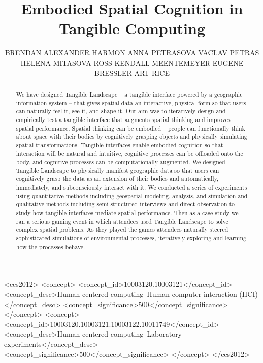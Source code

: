 \documentclass[prodmode,acmtochi]{acmsmall} %
\begin{document}

\title{Embodied Spatial Cognition in Tangible Computing} %
\author{BRENDAN ALEXANDER HARMON
ANNA PETRASOVA
VACLAV PETRAS
HELENA MITASOVA
ROSS ​KENDALL MEENTEMEYER
EUGENE BRESSLER
ART RICE
}

\begin{abstract}
%
We have designed Tangible Landscape -- a tangible interface powered by a geographic information system -- 
that gives spatial data an interactive, physical form so that users can naturally feel it, see it, and shape it.
%
Our aim was to iteratively design and empirically test a tangible interface that augments spatial thinking and improves spatial performance. 
%
Spatial thinking can be embodied -- people can functionally think about space with their bodies by cognitively grasping objects and physically simulating spatial transformations.
%
Tangible interfaces enable embodied cognition so that 
interaction will be natural and intuitive,
cognitive processes can be offloaded onto the body,
and cognitive processes can be computationally augmented.
%
We designed Tangible Landscape to physically manifest geographic data %
so that users can cognitively grasp the data as an extension of their bodies 
and automatically, immediately, and subconsciously interact with it. 
%
We conducted a series of experiments using quantitative methods including geospatial modeling, analysis, and simulation and qualitative methods including semi-structured interviews and direct observation
to study how tangible interfaces mediate spatial performance. 
%
%
Then as a case study we ran a serious gaming event 
in which attendees used Tangible Landscape to solve complex spatial problems. 
%
As they played the games
attendees naturally steered sophisticated simulations of environmental processes,
iteratively exploring and learning how the processes behave. 
%
\end{abstract}

%
%
\begin{CCSXML}
<ccs2012>
<concept>
<concept_id>10003120.10003121</concept_id>
<concept_desc>Human-centered computing~Human computer interaction (HCI)</concept_desc>
<concept_significance>500</concept_significance>
</concept>
<concept>
<concept_id>10003120.10003121.10003122.10011749</concept_id>
<concept_desc>Human-centered computing~Laboratory experiments</concept_desc>
<concept_significance>500</concept_significance>
</concept>
</ccs2012>
\end{CCSXML}
\end{document}
